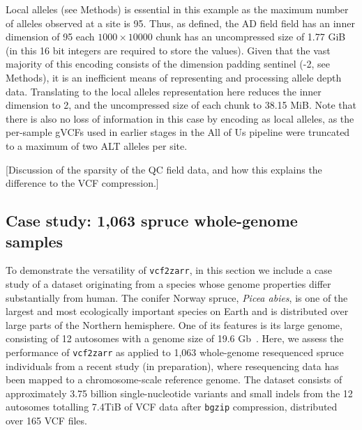 \documentclass[a4paper,num-refs]{oup-contemporary}
\begin{document}
Local alleles (see Methods) is essential in this example
as the maximum number of alleles observed at a site is 95.
Thus, as defined, the AD field field has an inner dimension of 95
each $1000\times10000$ chunk 
has an uncompressed size of 1.77 GiB (in this 16 bit integers are required
to store the values). Given that the vast majority
of this encoding consists of the dimension padding sentinel (-2, see 
Methods), it is an inefficient means of representing and processing 
allele depth data. Translating to the local alleles representation
here reduces the inner dimension to 2, and the uncompressed 
size of each chunk to 38.15 MiB. 
Note that there is also no loss of information in this case 
by encoding as local alleles, as the per-sample gVCFs used 
in earlier stages in the All of Us pipeline were truncated
to a maximum of two ALT alleles per site. 

[Discussion of the sparsity of the QC field data, and how this 
explains the difference to the VCF compression.]

\subsection{Case study: 1,063 spruce whole-genome samples}

To demonstrate the versatility of \texttt{vcf2zarr}, in this section
we include a case study of a dataset originating from a species whose
genome properties differ substantially from human. The conifer Norway
spruce, \emph{Picea abies}, is one of the largest and most
ecologically important species on Earth and is distributed over large
parts of the Northern hemisphere. One of its features is its large
genome, consisting of 12 autosomes with a genome size of 19.6
Gb~\cite{nystedt_NorwaySpruceGenome_2013}. Here, we assess the
performance of \texttt{vcf2zarr} as applied to 1,063 whole-genome
resequenced spruce individuals from a recent study (in preparation),
where resequencing data has been mapped to a chromosome-scale
reference genome. The dataset consists of approximately 3.75 billion
single-nucleotide variants and small indels from the 12 autosomes
totalling 7.4TiB of VCF data after \texttt{bgzip} compression,
distributed over 165 VCF files. 
\end{document}
